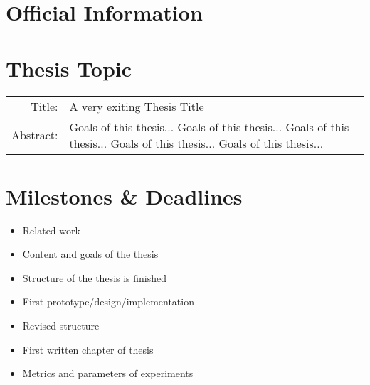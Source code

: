 






\maketitle

\section{Official Information}
\student \prof \assistent

\section{Thesis Topic}
\begin{tabular}{rp{14cm}}
    Title:      & A very exiting Thesis Title \\
    Abstract:	& Goals of this thesis... Goals of this thesis... Goals of this thesis... Goals of this thesis... Goals of this thesis... 
\end{tabular}

\newpage
\section{Milestones \& Deadlines}
    \begin{itemize}
        \item Related work
        \item Content and goals of the thesis
        \item Structure of the thesis is finished
    \end{itemize}

        \begin{itemize}
            \item First prototype/design/implementation
            \item Revised structure
            \item First written chapter of thesis
            \item Metrics and parameters of experiments
        \end{itemize}

